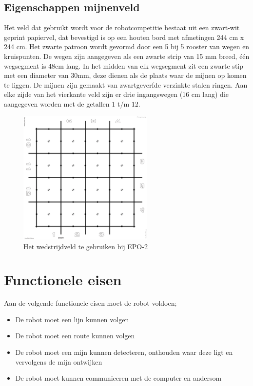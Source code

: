 \documentclass{report}
\begin{document}
\subsection{Eigenschappen mijnenveld}

Het veld dat gebruikt wordt voor de robotcompetitie bestaat uit een zwart-wit geprint papiervel, dat bevestigd is op een houten bord met afmetingen 244 cm x 244 cm.
Het zwarte patroon wordt gevormd door een 5 bij 5 rooster van wegen en kruispunten.
De wegen zijn aangegeven als een zwarte strip van 15 mm breed, één wegsegment is 48cm lang.
In het midden van elk wegsegment zit een zwarte stip met een diameter van 30mm, deze dienen als de plaats waar de mijnen op komen te liggen.
De mijnen zijn gemaakt van zwartgeverfde verzinkte stalen ringen.
Aan elke zijde van het vierkante veld zijn er drie ingangswegen (16 cm lang) die aangegeven worden met de getallen 1 t/m 12.


\begin{figure}[H]
	\centering
	\includegraphics[width=0.6\textwidth]{competitionField2440x2440-rc.pdf}
	\caption{Het wedstrijdveld te gebruiken bij EPO-2}
	\label{fig:field}
\end{figure}


\section{Functionele eisen}

Aan de volgende functionele eisen moet de robot voldoen;

\begin{itemize}

\item
De robot moet een lijn kunnen volgen

\item 
De robot moet een route kunnen volgen

\item
De robot moet een mijn kunnen detecteren, onthouden waar deze ligt en vervolgens de mijn ontwijken

\item 
De robot moet kunnen communiceren met de computer en andersom

\end{itemize}
\end{document}
